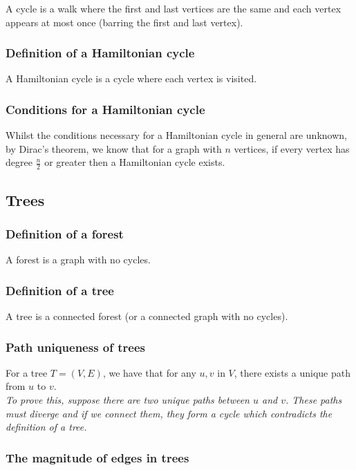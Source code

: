 \documentclass[a4paper, 12pt, twoside]{article}
\begin{document}
A cycle is a walk where the first and last vertices are the same
and each vertex appears at most once (barring the first and last
vertex).

\subsubsection{Definition of a Hamiltonian cycle}

A Hamiltonian cycle is a cycle where each vertex is visited.

\subsubsection{Conditions for a Hamiltonian cycle}

Whilst the conditions necessary for a Hamiltonian cycle in general
are unknown, by Dirac's theorem, we know that for a graph with
$n$ vertices, if every vertex has degree $\frac{n}{2}$ or greater
then a Hamiltonian cycle exists.

\subsection{Trees}

\subsubsection{Definition of a forest}

A forest is a graph with no cycles.

\subsubsection{Definition of a tree}

A tree is a connected forest (or a connected graph with no cycles).

\subsubsection{Path uniqueness of trees}

For a tree $T = (V, E)$, we have that for any $u, v$ in $V$, there
exists a unique path from $u$ to $v$.
\\[\baselineskip]
\textit{To prove this, suppose there are two unique paths between
$u$ and $v$. These paths must diverge and if we connect them, they
form a cycle which contradicts the definition of a tree.}

\subsubsection{The magnitude of edges in trees}
\end{document}
